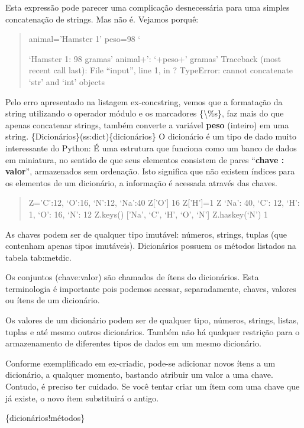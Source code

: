 \documentclass[a4paper,10pt,brazil]{sphinxmanual}
\begin{document}
Esta expressão pode parecer uma complicação desnecessária para uma
simples concatenação de strings. Mas não é. Vejamos porquê:
\begin{quote}

animal='Hamster 1' peso=98 `

`Hamster 1: 98 gramas' animal+': `+peso+' gramas' Traceback (most
recent call last): File ``input'', line 1, in ? TypeError: cannot
concatenate `str' and `int' objects
\end{quote}

Pelo erro apresentado na listagem ex-concstring, vemos que a
formatação da string utilizando o operador módulo e os marcadores
\{\textbackslash{}\%s\}, faz mais do que apenas concatenar strings, também converte
a variável \textbf{peso} (inteiro) em uma string.
\{Dicionários\}(ss:dict)\{dicionários\} O dicionário é um tipo de dado
muito interessante do Python: É uma estrutura que funciona como um
banco de dados em miniatura, no sentido de que seus elementos
consistem de pares ``\textbf{chave : valor}'', armazenados sem ordenação.
Isto significa que não existem índices para os elementos de um
dicionário, a informação é acessada através das chaves.
\begin{quote}

Z='C':12, `O':16, `N':12, `Na':40 Z{[}'O'{]} 16 Z{[}'H'{]}=1 Z `Na': 40,
`C': 12, `H': 1, `O': 16, `N': 12 Z.keys() {[}'Na', `C', `H', `O',
`N'{]} Z.haskey(`N') 1
\end{quote}

As chaves podem ser de qualquer tipo imutável: números, strings,
tuplas (que contenham apenas tipos imutáveis). Dicionários possuem
os métodos listados na tabela tab:metdic.

Os conjuntos (chave:valor) são chamados de ítens do dicionários.
Esta terminologia é importante pois podemos acessar, separadamente,
chaves, valores ou ítens de um dicionário.

Os valores de um dicionário podem ser de qualquer tipo, números,
strings, listas, tuplas e até mesmo outros dicionários. Também não
há qualquer restrição para o armazenamento de diferentes tipos de
dados em um mesmo dicionário.

Conforme exemplificado em ex-criadic, pode-se adicionar novos ítens
a um dicionário, a qualquer momento, bastando atribuir um valor a
uma chave. Contudo, é preciso ter cuidado. Se você tentar criar um
ítem com uma chave que já existe, o novo ítem substituirá o
antigo.

\{dicionários!métodos\}
\end{document}
